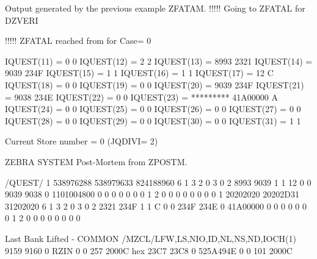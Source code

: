 \begin{landscapebody}
\begin{XMPt}{Output generated by the previous example}
ZFATAM.  !!!!!  Going to ZFATAL for DZVERI

!!!!! ZFATAL reached from   for Case=  0

         IQUEST(11) =         0                0
         IQUEST(12) =         2                2
         IQUEST(13) =      8993             2321
         IQUEST(14) =      9039             234F
         IQUEST(15) =         1                1
         IQUEST(16) =         1                1
         IQUEST(17) =        12                C
         IQUEST(18) =         0                0
         IQUEST(19) =         0                0
         IQUEST(20) =      9039             234F
         IQUEST(21) =      9038             234E
         IQUEST(22) =         0                0
         IQUEST(23) = *********         41A00000   A 
         IQUEST(24) =         0                0
         IQUEST(25) =         0                0
         IQUEST(26) =         0                0
         IQUEST(27) =         0                0
         IQUEST(28) =         0                0
         IQUEST(29) =         0                0
         IQUEST(30) =         0                0
         IQUEST(31) =         1                1

         Current Store number =  0  (JQDIVI= 2)

ZEBRA SYSTEM Post-Mortem from ZPOSTM.

/QUEST/
             1    538976288    538979633    824188960            6            1            3            2
             0            3            0            2         8993         9039            1            1
            12            0            0         9039         9038            0   1101004800            0
             0            0            0            0            0            0            1            2
             0            0            0            0            0            0            0            0
             1     20202020     20202D31     31202020            6            1            3            2
             0            3            0            2         2321         234F            1            1
             C            0            0         234F         234E            0     41A00000            0
             0            0            0            0            0            0            1            2
             0            0            0            0            0            0            0            0

Last Bank Lifted - COMMON /MZCL/LFW,LS,NIO,ID,NL,NS,ND,IOCH(1)
       9159      9160   0  RZIN       0       0     257        2000C hex
          23C7         23C8            0     525A494E            0            0          101        2000C


\end{XMPt}
\end{landscapebody}
